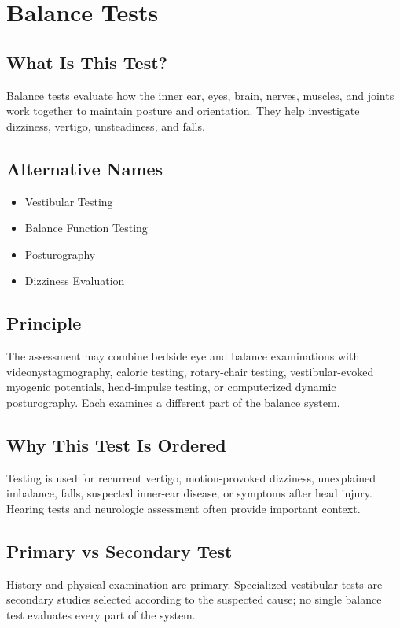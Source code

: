 \chapter{Balance Tests}

\section*{What Is This Test?}
Balance tests evaluate how the inner ear, eyes, brain, nerves, muscles, and joints work together to maintain posture and orientation. They help investigate dizziness, vertigo, unsteadiness, and falls.

\section*{Alternative Names}
\begin{itemize}
  \item Vestibular Testing
  \item Balance Function Testing
  \item Posturography
  \item Dizziness Evaluation
\end{itemize}

\section*{Principle}
The assessment may combine bedside eye and balance examinations with videonystagmography, caloric testing, rotary-chair testing, vestibular-evoked myogenic potentials, head-impulse testing, or computerized dynamic posturography. Each examines a different part of the balance system.

\section*{Why This Test Is Ordered}
Testing is used for recurrent vertigo, motion-provoked dizziness, unexplained imbalance, falls, suspected inner-ear disease, or symptoms after head injury. Hearing tests and neurologic assessment often provide important context.

\section*{Primary vs Secondary Test}
History and physical examination are primary. Specialized vestibular tests are secondary studies selected according to the suspected cause; no single balance test evaluates every part of the system.

